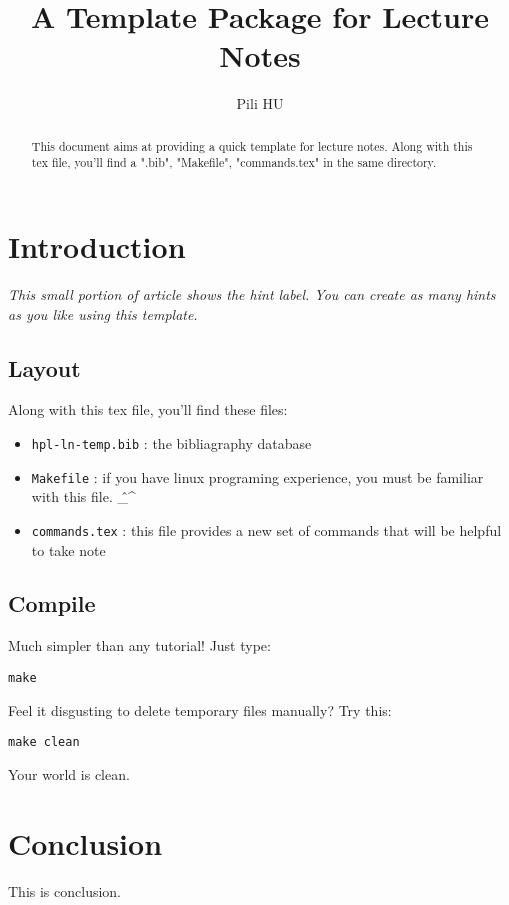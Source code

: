 \documentclass[11pt]{article}
\makeatletter
\newenvironment{hint}
{\begin{center}\begin{minipage}{0.55\linewidth}\begin{framed}\it}
{\end{framed}\end{minipage}\end{center}}
\renewcommand{\maketitle}{
	aaa
}
\makeatother
\begin{document}
\title{\sc A Template Package for Lecture Notes}
\author{Pili HU}


\begin{abstract}
This document\citep{SampleBib} aims at providing a quick template for lecture notes. Along with this tex file, you'll find a ".bib", "Makefile", "commands.tex" in the same directory.  

\end{abstract}

\section{Introduction}


\begin{hint}
This small portion of article shows the hint label. You can create as many hints as you like using this template. 
\end{hint}

\subsection{Layout}
Along with this tex file, you'll find these files:
\begin{itemize}
	\item \verb!hpl-ln-temp.bib! : the bibliagraphy database
	\item \verb!Makefile! : if you have linux programing experience, you must be familiar with this file. \textnormal{\^\_\^}
	\item \verb!commands.tex! : this file provides a new set of commands that will be helpful to take note
\end{itemize}

\subsection{Compile}
Much simpler than any tutorial! Just type:
\begin{verbatim}
make
\end{verbatim}
Feel it disgusting to delete temporary files manually? Try this:
\begin{verbatim}
make clean
\end{verbatim}
Your world is clean.

\section{Conclusion}

This is conclusion.


    
       
\end{document}
